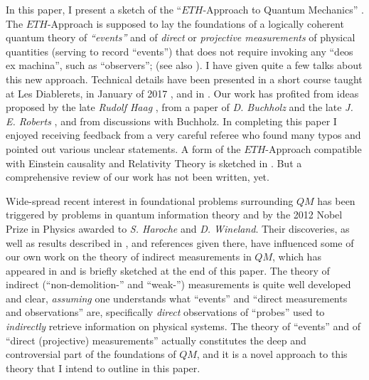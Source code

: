 \documentclass[12pt]{article}
\begin{document}
In this paper, I present a sketch of the ``$\textit{ETH}$-Approach to Quantum Mechanics'' \cite{FS-Prob-Theory, BFS-forks, Schubnel-thesis}. The $\textit{ETH}$-Approach is supposed to lay the foundations of a logically coherent quantum theory of \textit{``events''} \cite{Haag} and of \textit{direct} or \textit{projective measurements} of physical quantities (serving to record ``events'') that does not require invoking any ``deos ex machina'', such as ``observers''; (see also \cite{Durr-Teufel}). I have given quite a few talks about this new approach. Technical details have been presented in a short course taught at Les Diablerets, in January of 2017 \cite{Les-Diablerets}, and in \cite{FFS, FS-state-prep}. Our work has profited from ideas proposed by the late \textit{Rudolf Haag} \cite{Haag}, from a paper of \textit{D. Buchholz} and the late \textit{J. E. Roberts} \cite{Buchholz}, and from discussions with Buchholz. In completing this paper I enjoyed receiving feedback from a very careful referee who found many typos and pointed out various unclear statements. A form of the $\textit{ETH}$-Approach compatible with Einstein causality and Relativity Theory is sketched in \cite{Fr}. But a comprehensive review of our work has not been written, yet. 

Wide-spread recent interest in foundational problems surrounding $QM$ has been triggered by problems in quantum information theory and by the 2012 Nobel Prize in Physics awarded to \textit{S. Haroche} \cite{Raimond-Haroche} and \textit{D. Wineland}. Their discoveries, as well as results described in \cite{Bauer-Bernard, Maassen-Kummerer}, and references given there, have influenced some of our own work on the theory of indirect measurements in $QM$, which has appeared in \cite{BFFS, BCFFS-1, BCFFS-2} and is briefly sketched at the end of this paper. The theory of indirect (``non-demolition-'' and ``weak-'') measurements is quite well developed and clear, \textit{assuming} one understands what ``events'' and ``direct measurements and observations'' are, specifically \textit{direct} observations of ``probes'' used to \textit{indirectly} retrieve information on physical systems. The theory of ``events'' and of ``direct (projective) measurements'' actually constitutes the deep and controversial part of the foundations of $QM$, and it is a novel approach to this theory that I intend to outline in this paper. 
\end{document}
